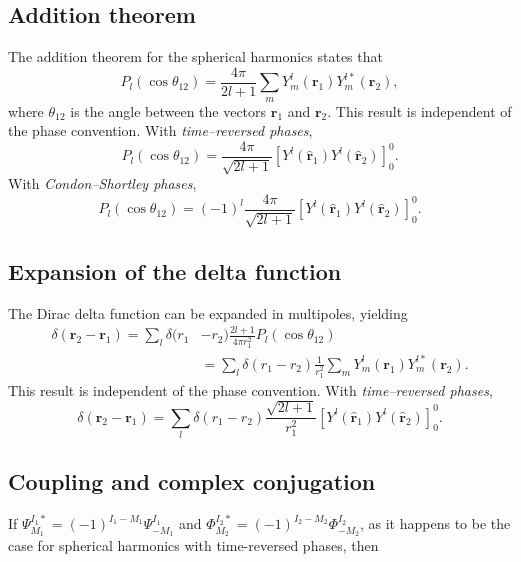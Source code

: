 \begin{subappendices}
\subsection{Addition theorem}
The addition theorem for the spherical harmonics states that
\begin{equation}\label{eq129}
P_l(\cos \theta_{12})=\frac{4\pi}{2l+1}\sum_m Y_m^l(\mathbf{r}_1)Y_m^{l*}(\mathbf{r}_2),
\end{equation}
where $\theta_{12}$ is the angle between the vectors $\mathbf{r}_1$ and $\mathbf{r}_2$. This result is independent of the phase convention. With \emph{time--reversed phases},
\begin{equation}\label{eq130}
P_l(\cos \theta_{12})=\frac{4\pi}{\sqrt{2l+1}}\left[ Y^{l}(\hat {\mathbf{r}}_1)Y^{l}(\hat {\mathbf{r}}_2) \right]^{0}_{0}.
\end{equation}
With \emph{Condon--Shortley phases},
\begin{equation}\label{eq131}
P_l(\cos \theta_{12})=(-1)^l\frac{4\pi}{\sqrt{2l+1}}\left[ Y^{l}(\hat {\mathbf{r}}_1)Y^{l}(\hat {\mathbf{r}}_2) \right]^{0}_{0}.
\end{equation}
\subsection{Expansion of the delta function}
The Dirac delta function can be expanded in multipoles, yielding
\begin{equation}\label{eq132}
\begin{split}
\delta(\mathbf{r}_2-\mathbf{r}_1)=\sum_l \delta(r_1&-r_2)\frac{2l+1}{4\pi r_{1}^2}P_l(\cos \theta_{12})\\
&=\sum_l \delta(r_1-r_2)\frac{1}{r_{1}^2}\sum_m Y_m^l(\mathbf{r}_1)Y_m^{l*}(\mathbf{r}_2).
\end{split}
\end{equation}
This result is independent of the phase convention. With \emph{time--reversed phases},
\begin{equation}\label{eq133}
\delta(\mathbf{r}_2-\mathbf{r}_1)=\sum_l \delta(r_1-r_2)\frac{\sqrt{2l+1}}{r_{1}^2}\left[ Y^{l}(\hat {\mathbf{r}}_1)Y^{l}(\hat {\mathbf{r}}_2) \right]^{0}_{0}.
\end{equation}
\subsection{Coupling and complex conjugation}
If $\Psi^{I_1*}_{M_1}=(-1)^{I_1-M_1}\Psi^{I_1}_{-M_1}$ and $\Phi^{I_2*}_{M_2}=(-1)^{I_2-M_2}\Phi^{I_2}_{-M_2}$, as it happens to be the case for spherical harmonics with time-reversed phases, then


\end{subappendices}

